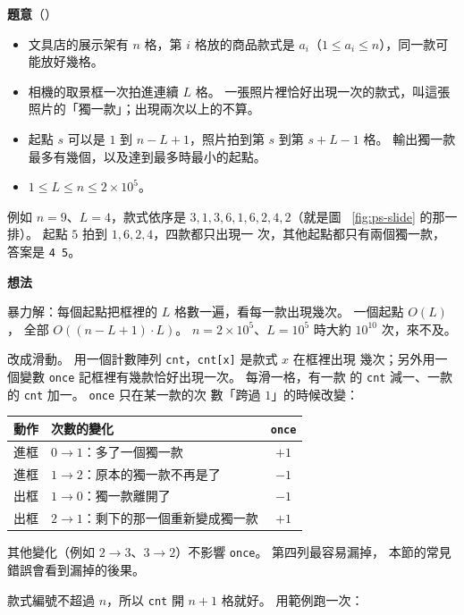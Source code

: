 \textbf{題意}（）

\begin{itemize}
\item 文具店的展示架有 $n$ 格，第 $i$ 格放的商品款式是 $a_i$（$1 \le a_i \le
n$），同一款可能放好幾格。
\item 相機的取景框一次拍進連續 $L$ 格。 一張照片裡恰好出現一次的款式，叫這張
照片的「獨一款」；出現兩次以上的不算。
\item 起點 $s$ 可以是 $1$ 到 $n - L + 1$，照片拍到第 $s$ 到第 $s + L - 1$ 格。
輸出獨一款最多有幾個，以及達到最多時最小的起點。
\item $1 \le L \le n \le 2 \times 10^5$。
\end{itemize}

例如 $n = 9$、$L = 4$，款式依序是 $3, 1, 3, 6, 1, 6, 2, 4, 2$（就是圖
~\ref{fig:ps-slide} 的那一排）。 起點 $5$ 拍到 $1, 6, 2, 4$，四款都只出現一
次，其他起點都只有兩個獨一款，答案是 \texttt{4 5}。

\textbf{想法}

暴力解：每個起點把框裡的 $L$ 格數一遍，看每一款出現幾次。 一個起點 $O(L)$，
全部 $O((n - L + 1) \cdot L)$。 $n = 2 \times 10^5$、$L = 10^5$ 時大約
$10^{10}$ 次，來不及。

改成滑動。 用一個計數陣列 \texttt{cnt}，\texttt{cnt[x]} 是款式 $x$ 在框裡出現
幾次；另外用一個變數 \texttt{once} 記框裡有幾款恰好出現一次。 每滑一格，有一款
的 \texttt{cnt} 減一、一款的 \texttt{cnt} 加一。 \texttt{once} 只在某一款的次
數「跨過 $1$」的時候改變：

\begin{center}
\begin{tabular}{llc}
\toprule
動作 & 次數的變化 & \texttt{once} \\
\midrule
進框 & $0 \to 1$：多了一個獨一款 & $+1$ \\
進框 & $1 \to 2$：原本的獨一款不再是了 & $-1$ \\
出框 & $1 \to 0$：獨一款離開了 & $-1$ \\
出框 & $2 \to 1$：剩下的那一個重新變成獨一款 & $+1$ \\
\bottomrule
\end{tabular}
\end{center}

其他變化（例如 $2 \to 3$、$3 \to 2$）不影響 \texttt{once}。 第四列最容易漏掉，
本節的常見錯誤會看到漏掉的後果。

款式編號不超過 $n$，所以 \texttt{cnt} 開 $n + 1$ 格就好。 用範例跑一次：

